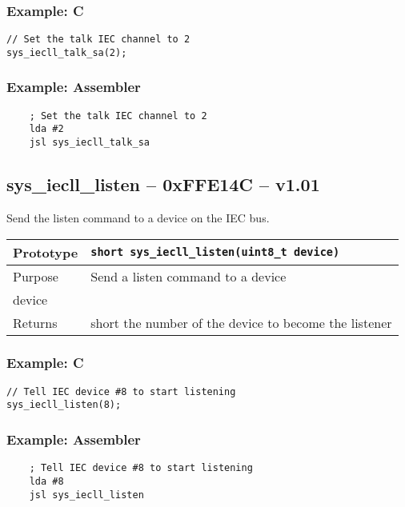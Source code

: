 \subsubsection*{Example: C}
\begin{lstlisting}
// Set the talk IEC channel to 2
sys_iecll_talk_sa(2);
\end{lstlisting}

\subsubsection*{Example: Assembler}
\begin{verbatim}
    ; Set the talk IEC channel to 2
    lda #2
    jsl sys_iecll_talk_sa
\end{verbatim}


\subsection*{sys\_iecll\_listen -- 0xFFE14C -- v1.01}
Send the {\sc listen} command to a device on the IEC bus.

\bigskip

\begin{table}[!h]\begin{tabular}{|l||l|} \hline
Prototype & \lstinline!short sys_iecll_listen(uint8_t device)! \\ \hline
Purpose & Send a {\sc listen} command to a device \\ \hline
device &  \\ \hline
Returns & short the number of the device to become the listener \\ \hline
\end{tabular}\end{table}

\subsubsection*{Example: C}
\begin{lstlisting}
// Tell IEC device #8 to start listening
sys_iecll_listen(8);
\end{lstlisting}

\subsubsection*{Example: Assembler}
\begin{verbatim}
    ; Tell IEC device #8 to start listening
    lda #8
    jsl sys_iecll_listen
\end{verbatim}


